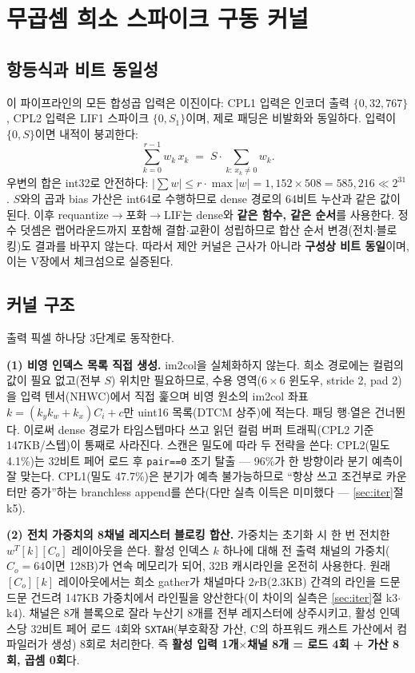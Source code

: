 \section{무곱셈 희소 스파이크 구동 커널}\label{sec:kernel}

\subsection{항등식과 비트 동일성}\label{sec:identity}

이 파이프라인의 모든 합성곱 입력은 이진이다: CPL1 입력은 인코더
출력 $\{0, 32{,}767\}$, CPL2 입력은 LIF1 스파이크 $\{0, S_1\}$이며,
제로 패딩은 비발화와 동일하다. 입력이 $\{0, S\}$이면 내적이
붕괴한다:
\begin{equation}
\sum_{k=0}^{r-1} w_k\, x_k \;=\; S \cdot \!\!\sum_{k:\,x_k \neq 0}\!\! w_k .
\label{eq:collapse}
\end{equation}
우변의 합은 int32로 안전하다: $|\sum w| \le r\cdot\max|w| =
1{,}152\times508 = 585{,}216 \ll 2^{31}$. $S$와의 곱과 bias 가산은
int64로 수행하므로 dense 경로의 64비트 누산과 같은 값이 된다. 이후
requantize$\rightarrow$포화$\rightarrow$LIF는 dense와 \textbf{같은
함수, 같은 순서}를 사용한다. 정수 덧셈은 랩어라운드까지 포함해
결합$\cdot$교환이 성립하므로 합산 순서 변경(전치$\cdot$블로킹)도
결과를 바꾸지 않는다. 따라서 제안 커널은 근사가 아니라 \textbf{구성상
비트 동일}이며, 이는 V장에서 체크섬으로 실증된다.

\subsection{커널 구조}\label{sec:structure}

출력 픽셀 하나당 3단계로 동작한다.

\textbf{(1) 비영 인덱스 목록 직접 생성.} im2col을 실체화하지 않는다.
희소 경로에는 컬럼의 값이 필요 없고(전부 $S$) 위치만 필요하므로,
수용 영역($6{\times}6$ 윈도우, stride 2, pad 2)을 입력 텐서(NHWC)에서
직접 훑으며 비영 원소의 im2col 좌표 $k = (k_y k_w + k_x)C_i + c$만
uint16 목록(DTCM 상주)에 적는다. 패딩 행$\cdot$열은 건너뛴다. 이로써
dense 경로가 타임스텝마다 쓰고 읽던 컬럼 버퍼 트래픽(CPL2 기준
147KB/스텝)이 통째로 사라진다. 스캔은 밀도에 따라 두 전략을 쓴다:
CPL2(밀도 4.1\%)는 32비트 페어 로드 후 \texttt{pair==0} 조기 탈출
--- 96\%가 한 방향이라 분기 예측이 잘 맞는다. CPL1(밀도 47.7\%)은
분기가 예측 불가능하므로 ``항상 쓰고 조건부로 카운터만 증가''하는
branchless append를 쓴다(다만 실측 이득은 미미했다 ---
\ref{sec:iter}절 k5).

\textbf{(2) 전치 가중치의 8채널 레지스터 블로킹 합산.} 가중치는
초기화 시 한 번 전치한 $w^{T}[k][C_o]$ 레이아웃을 쓴다. 활성 인덱스
$k$ 하나에 대해 전 출력 채널의 가중치($C_o{=}64$이면 128B)가 연속
메모리가 되어, 32B 캐시라인을 온전히 사용한다. 원래 $[C_o][k]$
레이아웃에서는 희소 gather가 채널마다 $2r$B(2.3KB) 간격의 라인을
드문드문 건드려 147KB 가중치에서 라인필을 양산한다(이 차이의 실측은
\ref{sec:iter}절 k3$\cdot$k4). 채널은 8개 블록으로 잘라 누산기 8개를
전부 레지스터에 상주시키고, 활성 인덱스당 32비트 페어 로드 4회와
\texttt{SXTAH}(부호확장 가산, C의 하프워드 캐스트 가산에서 컴파일러가
생성) 8회로 처리한다. 즉 \textbf{활성 입력 1개$\times$채널 8개 = 로드
4회 + 가산 8회, 곱셈 0회}다.

